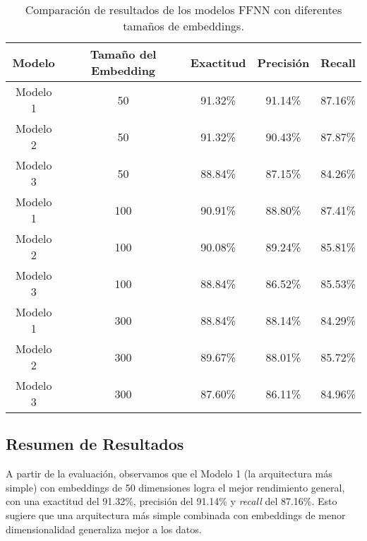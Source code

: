 \documentclass[11pt,english]{article}
\theoremstyle{plain}
\begin{document}
\begin{table}[h!]
\centering
\begin{tabular}{|c|c|c|c|c|}
\hline
\textbf{Modelo} & \textbf{Tamaño del Embedding} & \textbf{Exactitud} & \textbf{Precisión} & \textbf{Recall} \\ \hline
Modelo 1        & 50                            & 91.32\%            & 91.14\%            & 87.16\%         \\ \hline
Modelo 2        & 50                            & 91.32\%            & 90.43\%            & 87.87\%         \\ \hline
Modelo 3        & 50                            & 88.84\%            & 87.15\%            & 84.26\%         \\ \hline
Modelo 1        & 100                           & 90.91\%            & 88.80\%            & 87.41\%         \\ \hline
Modelo 2        & 100                           & 90.08\%            & 89.24\%            & 85.81\%         \\ \hline
Modelo 3        & 100                           & 88.84\%            & 86.52\%            & 85.53\%         \\ \hline
Modelo 1        & 300                           & 88.84\%            & 88.14\%            & 84.29\%         \\ \hline
Modelo 2        & 300                           & 89.67\%            & 88.01\%            & 85.72\%         \\ \hline
Modelo 3        & 300                           & 87.60\%            & 86.11\%            & 84.96\%         \\ \hline
\end{tabular}
\caption{Comparación de resultados de los modelos FFNN con diferentes tamaños de embeddings.}
\end{table}

\subsection*{Resumen de Resultados}

A partir de la evaluación, observamos que el Modelo 1 (la arquitectura más simple) con embeddings de 50 dimensiones logra el mejor rendimiento general, con una exactitud del 91.32\%, precisión del 91.14\% y \textit{recall} del 87.16\%. Esto sugiere que una arquitectura más simple combinada con embeddings de menor dimensionalidad generaliza mejor a los datos.
\end{document}
